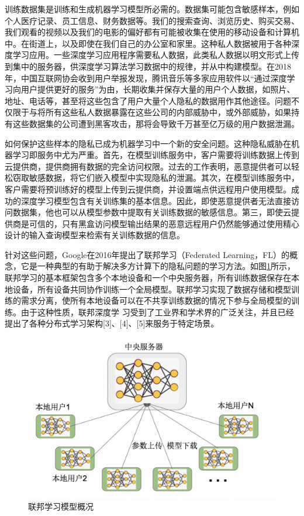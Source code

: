 训练数据集是训练和生成机器学习模型所必需的。数据集可能包含敏感样本，例如个人医疗记录、员工信息、财务数据等。我们的搜索查询、浏览历史、购买交易、我们观看的视频以及我们的电影的偏好都有可能被收集在使用的移动设备和计算机中。在街道上，以及即使在我们自己的办公室和家里。这种私人数据被用于各种深度学习应用。一些深度学习应用程序需要私人数据，此类私人数据以明文形式上传到集中的服务器，供深度学习算法学习数据中的规律，并从中构建模型。在2018年，中国互联网协会收到用户举报发现，腾讯音乐等多家应用软件以“通过深度学习向用户提供更好的服务”为由，长期收集并保存大量的用户个人数据，如照片、地址、电话等，甚至将这些包含了用户大量个人隐私的数据用作其他途径。问题不仅限于与将所有这些私人数据暴露在这些公司的内部威胁中，或外部威胁，如果持有这些数据集的公司遭到黑客攻击，那将会导致千万甚至亿万级的用户数据泄漏。

如何保护这些样本的隐私已成为机器学习中一个新的安全问题。这种隐私威胁在机器学习即服务中尤为严重。首先，在模型训练服务中，客户需要将训练数据上传到云提供商，提供商拥有数据的完全访问权限。过去的工作表明，恶意提供者可以轻松窃取敏感数据，将它们嵌入模型中实现隐私的泄漏。其次，在模型训练服务中，客户需要将预训练好的模型上传到云提供商，并设置端点供远程用户使用模型。成功的深度学习模型包含有关训练集的基本信息。因此，即使恶意提供者无法直接访问数据集，他也可以从模型参数中提取有关训练数据的敏感信息。第三，即使云提供商是可信的，只有黑盒访问模型输出结果的恶意远程用户仍然能够通过使用精心设计的输入查询模型来检索有关训练数据的信息。

针对这些问题，Google在2016年提出了联邦学习（Federated Learning，FL）的概念，它是一种典型的有助于解决多方计算下的隐私问题的学习方法。如图\ref{fig:联邦学习模型概况}所示，联邦学习的基本框架包含多个本地设备和一个中央服务器，所有训练数据保存在本地设备，所有设备共同协作训练一个全局模型。联邦学习实现了数据存储和模型训练的需求分离，使所有本地设备可以在不共享训练数据的情况下参与全局模型的训练。由于这种性质，联邦深度学 习受到了工业界和学术界的广泛关注，并且已经提出了各种分布式学习架构[3]、[4]、[5]来服务于特定场景。

\begin{figure}[!hbt]
\centering
	\includegraphics[scale=0.5]{fig2/C1/联邦学习}%
	\caption{联邦学习模型概况}
	\label{fig:联邦学习模型概况}	
\end{figure}

